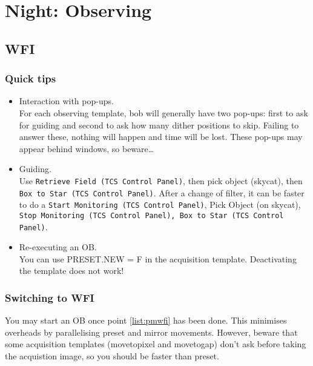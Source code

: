 \documentclass[11pt,fleqn]{book} %
\begin{document}
\chapter{Night: Observing}
\label{nightops}

\section{WFI}

\subsection{Quick tips}

\begin{itemize}
\item Interaction with pop-ups.\\
For each observing template, \gls{bob} will generally
have two pop-ups: first to ask for guiding and second to ask how many
dither positions to skip.  Failing to answer these, nothing will happen
and time will be lost.  These pop-ups may appear behind windows, so beware…
\item Guiding.\\
Use \texttt{Retrieve Field (TCS Control Panel)}, then pick object (skycat), then \texttt{Box to Star
(TCS Control Panel)}.  After a change of filter, it can be faster to do a
\texttt{Start Monitoring (TCS Control Panel)}, Pick Object (on skycat), \texttt{Stop Monitoring
(TCS Control Panel), Box to Star (TCS Control Panel)}. 
\item Re-executing an OB.\\
You can use PRESET.NEW = F in the acquisition template.  Deactivating the
template does not work!
\end{itemize}

\subsection{Switching to WFI}

You may start an OB once point \ref{list:pmwfi} has been done.  This minimises
overheads by parallelising preset and mirror movements.  However, beware that some acquisition templates (movetopixel and movetogap) don't ask before taking the acquistion image, so you should be faster than preset.  
\end{document}
